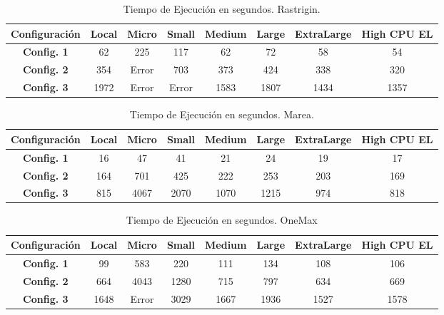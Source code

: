 \documentclass[runningheads]{llncs}
\begin{document}
\begin{table}[htb]
\begin{tabular}{|| c | c | c | c | c |c | c | c ||}
    \hline
    \textbf{Configuración} & \textbf{Local} & \textbf{Micro} & \textbf{Small} & \textbf{Medium} &
    \textbf{Large} & \textbf{ExtraLarge} & \textbf{High CPU EL}  \\

    \hline
    \textbf{Config. 1} & 62 & 225 & 117 & 62 & 72 & 58 & 54 \\
    \hline
    \textbf{Config. 2} & 354 & Error & 703 & 373 & 424 & 338 & 320 \\
    \hline
    \textbf{Config. 3} & 1972 & Error & Error & 1583 & 1807 & 1434 & 1357 \\
    \hline
  \end{tabular}
  \caption{Tiempo de Ejecución en segundos. Rastrigin.} 
  \label{TablaParametrosRastrigin}
\end{table}


\begin{table}[htb]
\begin{tabular}{|| c | c | c | c | c |c | c | c ||}
    \hline
    \textbf{Configuración} & \textbf{Local} & \textbf{Micro} & \textbf{Small} & \textbf{Medium} &
    \textbf{Large} & \textbf{ExtraLarge} & \textbf{High CPU EL}  \\

    \hline
    \textbf{Config. 1} & 16 & 47 & 41 & 21 & 24 & 19 & 17 \\
    \hline
    \textbf{Config. 2} & 164 & 701 & 425 & 222 & 253 & 203 & 169 \\
    \hline
    \textbf{Config. 3} & 815 & 4067 & 2070 & 1070 & 1215 & 974 & 818 \\
    \hline
  \end{tabular}
  \caption{Tiempo de Ejecución en segundos. Marea.} 
  \label{TablaParametrosMarea}
\end{table}


\begin{table}[htb]
\begin{tabular}{|| c | c | c | c | c |c | c | c ||}
    \hline
    \textbf{Configuración} & \textbf{Local} & \textbf{Micro} & \textbf{Small} & \textbf{Medium} &
    \textbf{Large} & \textbf{ExtraLarge} & \textbf{High CPU EL}  \\

    \hline
    \textbf{Config. 1} & 99 & 583 & 220 & 111 & 134 & 108 & 106 \\
    \hline
    \textbf{Config. 2} & 664 & 4043 & 1280 & 715 & 797 & 634 & 669 \\
    \hline
    \textbf{Config. 3} & 1648 & Error & 3029 & 1667 & 1936 & 1527 & 1578 \\
    \hline
  \end{tabular}
  \caption{Tiempo de Ejecución en segundos. OneMax} 
  \label{TablaParametrosOneMax}
\end{table}
\end{document}
